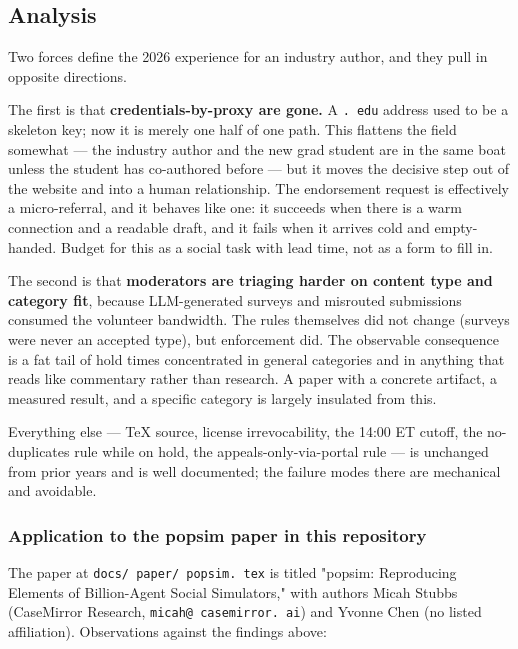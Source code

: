 \documentclass[twocolumn,10pt,letterpaper]{article}
\begin{document}
\subsection{Analysis}

Two forces define the 2026 experience for an industry author, and they pull in opposite directions.


The first is that \textbf{credentials-by-proxy are gone.} A \texttt{. edu} address used to be a skeleton key; now it is merely one half of one path. This flattens the field somewhat — the industry author and the new grad student are in the same boat unless the student has co-authored before — but it moves the decisive step out of the website and into a human relationship. The endorsement request is effectively a micro-referral, and it behaves like one: it succeeds when there is a warm connection and a readable draft, and it fails when it arrives cold and empty-handed. Budget for this as a social task with lead time, not as a form to fill in.


The second is that \textbf{moderators are triaging harder on content type and category fit}, because LLM-generated surveys and misrouted submissions consumed the volunteer bandwidth. The rules themselves did not change (surveys were never an accepted type), but enforcement did. The observable consequence is a fat tail of hold times concentrated in general categories and in anything that reads like commentary rather than research. A paper with a concrete artifact, a measured result, and a specific category is largely insulated from this.


Everything else — TeX source, license irrevocability, the 14:00 ET cutoff, the no-duplicates rule while on hold, the appeals-only-via-portal rule — is unchanged from prior years and is well documented; the failure modes there are mechanical and avoidable.


\subsubsection{Application to the popsim paper in this repository}

The paper at \texttt{docs/ paper/ popsim. tex} is titled "popsim: Reproducing Elements of Billion-Agent Social Simulators," with authors Micah Stubbs (CaseMirror Research, \texttt{micah@ casemirror. ai}) and Yvonne Chen (no listed affiliation). Observations against the findings above:
\end{document}
